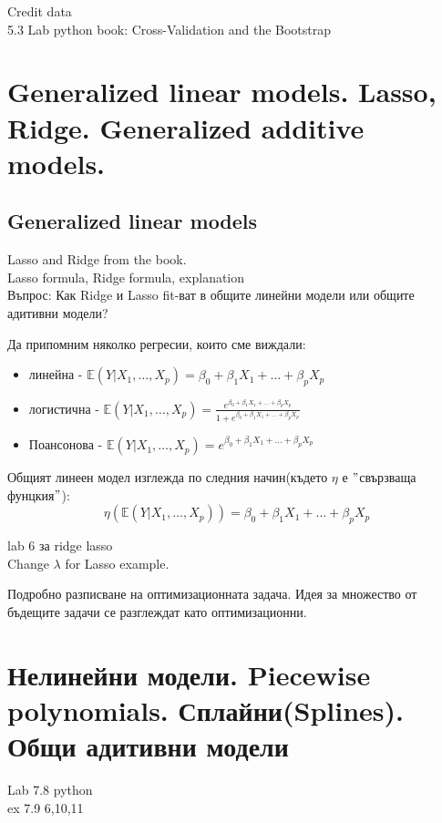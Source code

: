 \documentclass{article}
\begin{document}
	
	Credit data\\
	
	5.3 Lab python book: Cross-Validation and the Bootstrap \\
	
\newpage
\section{Generalized linear models. Lasso, Ridge. Generalized additive models. }
\subsection{Generalized linear models}


	Lasso and Ridge from the book.\\
	Lasso formula, Ridge formula, explanation \\
	Въпрос: Как Ridge и Lasso fit-ват в общите линейни модели или
	общите адитивни модели?
	
	
	
	Да припомним няколко регресии, които сме виждали:\\
	\begin{itemize}
		\item линейна - $\mathbb{E}(Y|X_1, \dots, X_p) = \beta_0 + \beta_1 X_1 + \dots + \beta_p X_p $
		\item логистична -  $ \mathbb{E}(Y|X_1, \dots, X_p) = \frac{e^{\beta_0 + \beta_1 X_1 + \dots + \beta_p X_p}}{1+ e^{\beta_0 + \beta_1 X_1 + \dots + \beta_p X_p}} $
		\item Поансонова -  $ \mathbb{E}(Y|X_1, \dots, X_p) = e^{\beta_0 + \beta_1 X_1 + \dots + \beta_p X_p} $
 	\end{itemize}
	
	Общият линеен модел изглежда по следния начин(където $\eta$ е $"$свързваща фунцкия$"$):\\
	$$\eta(\mathbb{E}(Y|X_1, \dots, X_p)) = \beta_0 + \beta_1 X_1 + \dots + \beta_p X_p $$
	
	lab 6 за ridge lasso \\
	Change $\lambda$ for Lasso example.
	
	
	
	Подробно разписване на оптимизационната задача. Идея за множество от бъдещите задачи
	се разглеждат като оптимизационни.
	
\newpage	
\section{Нелинейни модели. Piecewise polynomials. Сплайни(Splines). Общи адитивни модели}
Lab 7.8 python \\
ex 7.9 6,10,11 \\
\end{document}
